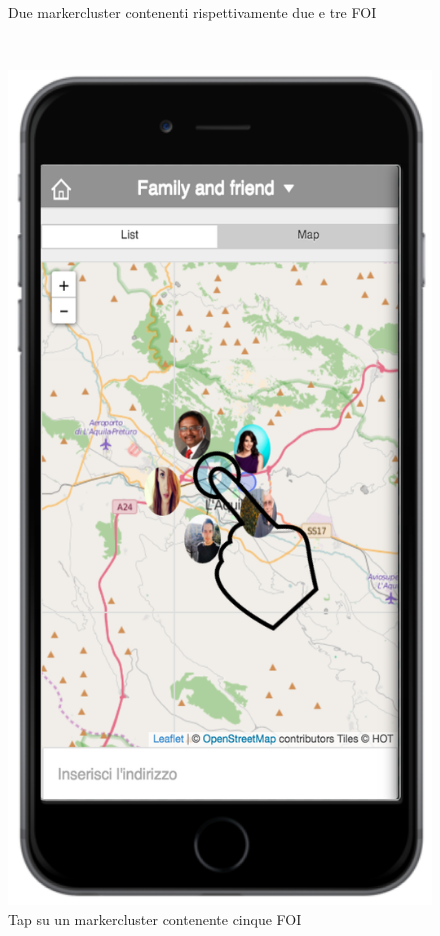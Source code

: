 \begin{figure}
\begin{minipage}[b]{6cm}
	\caption{Due markercluster contenenti rispettivamente due e tre FOI }
	\label{fig:markercluster}
 \end{minipage}
 \ \hspace{6 mm} \hspace{7 mm} \
 \begin{minipage}[b]{6cm}
\centering
\includegraphics[scale=0.6]{interfaccia/markerfoi.png}
	\caption{Tap su un markercluster contenente cinque FOI }
	\label{fig:markerfoi}
 \end{minipage}
\end{figure}

